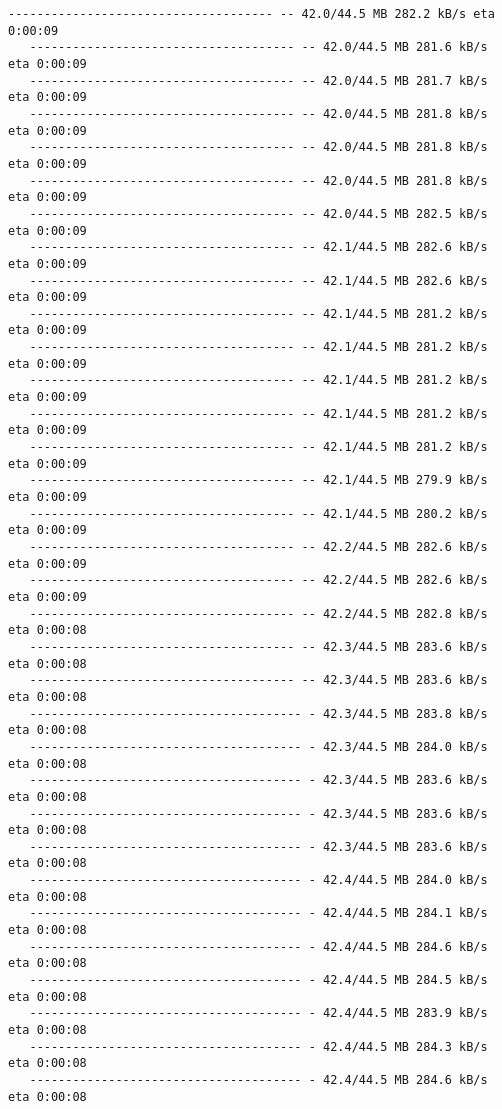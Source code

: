 \documentclass[11pt]{article}
\begin{document}
\begin{Verbatim}[commandchars=\\\{\}]
   ------------------------------------- -- 42.0/44.5 MB 282.2 kB/s eta 0:00:09
   ------------------------------------- -- 42.0/44.5 MB 281.6 kB/s eta 0:00:09
   ------------------------------------- -- 42.0/44.5 MB 281.7 kB/s eta 0:00:09
   ------------------------------------- -- 42.0/44.5 MB 281.8 kB/s eta 0:00:09
   ------------------------------------- -- 42.0/44.5 MB 281.8 kB/s eta 0:00:09
   ------------------------------------- -- 42.0/44.5 MB 281.8 kB/s eta 0:00:09
   ------------------------------------- -- 42.0/44.5 MB 282.5 kB/s eta 0:00:09
   ------------------------------------- -- 42.1/44.5 MB 282.6 kB/s eta 0:00:09
   ------------------------------------- -- 42.1/44.5 MB 282.6 kB/s eta 0:00:09
   ------------------------------------- -- 42.1/44.5 MB 281.2 kB/s eta 0:00:09
   ------------------------------------- -- 42.1/44.5 MB 281.2 kB/s eta 0:00:09
   ------------------------------------- -- 42.1/44.5 MB 281.2 kB/s eta 0:00:09
   ------------------------------------- -- 42.1/44.5 MB 281.2 kB/s eta 0:00:09
   ------------------------------------- -- 42.1/44.5 MB 281.2 kB/s eta 0:00:09
   ------------------------------------- -- 42.1/44.5 MB 279.9 kB/s eta 0:00:09
   ------------------------------------- -- 42.1/44.5 MB 280.2 kB/s eta 0:00:09
   ------------------------------------- -- 42.2/44.5 MB 282.6 kB/s eta 0:00:09
   ------------------------------------- -- 42.2/44.5 MB 282.6 kB/s eta 0:00:09
   ------------------------------------- -- 42.2/44.5 MB 282.8 kB/s eta 0:00:08
   ------------------------------------- -- 42.3/44.5 MB 283.6 kB/s eta 0:00:08
   ------------------------------------- -- 42.3/44.5 MB 283.6 kB/s eta 0:00:08
   -------------------------------------- - 42.3/44.5 MB 283.8 kB/s eta 0:00:08
   -------------------------------------- - 42.3/44.5 MB 284.0 kB/s eta 0:00:08
   -------------------------------------- - 42.3/44.5 MB 283.6 kB/s eta 0:00:08
   -------------------------------------- - 42.3/44.5 MB 283.6 kB/s eta 0:00:08
   -------------------------------------- - 42.3/44.5 MB 283.6 kB/s eta 0:00:08
   -------------------------------------- - 42.4/44.5 MB 284.0 kB/s eta 0:00:08
   -------------------------------------- - 42.4/44.5 MB 284.1 kB/s eta 0:00:08
   -------------------------------------- - 42.4/44.5 MB 284.6 kB/s eta 0:00:08
   -------------------------------------- - 42.4/44.5 MB 284.5 kB/s eta 0:00:08
   -------------------------------------- - 42.4/44.5 MB 283.9 kB/s eta 0:00:08
   -------------------------------------- - 42.4/44.5 MB 284.3 kB/s eta 0:00:08
   -------------------------------------- - 42.4/44.5 MB 284.6 kB/s eta 0:00:08

\end{Verbatim}
\end{document}
